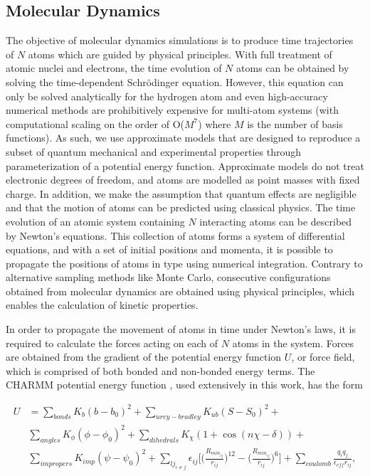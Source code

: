 \begin{refsection}
\section{Molecular Dynamics}

The objective of molecular dynamics simulations is to produce time trajectories of $N$ atoms which are guided by physical principles. With full treatment of atomic nuclei and electrons, the time evolution of $N$ atoms can be obtained by solving the time-dependent Schr\"{o}dinger equation. However, this equation can only be solved analytically for the hydrogen atom and even high-accuracy numerical methods are prohibitively expensive for multi-atom systems (with computational scaling on the order of O($M^{7}$) where $M$ is the number of basis functions)\cite{Jensen:2007wr}. As such, we use approximate models that are designed to reproduce a subset of quantum mechanical and experimental properties through parameterization of a potential energy function. Approximate models do not treat electronic degrees of freedom, and atoms are modelled as point masses with fixed charge. In addition, we make the assumption that quantum effects are negligible and that the motion of atoms can be predicted using classical physics. The time evolution of an atomic system containing $N$ interacting atoms can be described by Newton's equations. This collection of atoms forms a system of differential equations, and with a set of initial positions and momenta, it is possible to propagate the positions of atoms in type using numerical integration. Contrary to alternative sampling methods like Monte Carlo, consecutive configurations obtained from molecular dynamics are obtained using physical principles, which enables the calculation of kinetic properties.

In order to propagate the movement of atoms in time under Newton's laws, it is required to calculate the forces acting on each of $N$ atoms in the system. Forces are obtained from the gradient of the potential energy function $U$, or force field, which is comprised of both bonded and non-bonded energy terms. The CHARMM potential energy function \cite{MacKerell:1998tp}, used extensively in this work, has the form

\begin{equation}
\label{eq:4}
\begin{split}
U & = \sum_{bonds} K_b (b-b_0)^2 + \sum_{urey-bradley} K_{ub} (S-S_0)^2 + \\
    & \sum_{angles} K_{\phi} (\phi - \phi_0)^2 + \sum_{dihedrals} K_{\chi} (1+\cos(n\chi - \delta)) + \\
    & \sum_{impropers} K_{imp} (\psi - \psi_0)^2 + \sum_{lj_{i \neq j}} \epsilon_{ij} \Big[   \big(  \frac{R_{min_{ij}}}{r_{ij}} \big)^{12} - \big(  \frac{R_{min_{ij}}}{r_{ij}} \big)^{6}   \Big] + \sum_{coulomb} \frac{q_i q_j}{\epsilon_{eff} r_{ij}}, \\
\end{split}
\end{equation}


\end{refsection}

